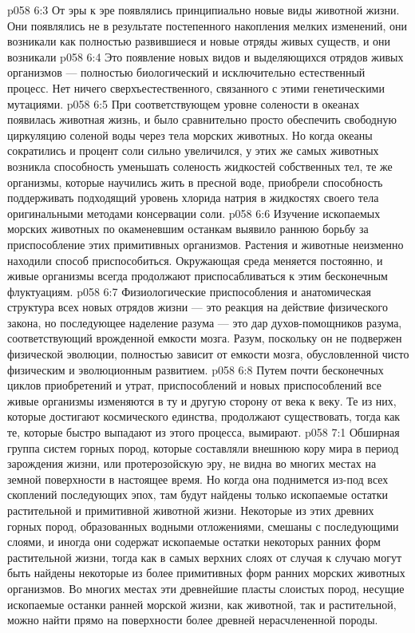 \vs p058 6:3 От эры к эре появлялись принципиально новые виды животной жизни. Они появлялись не в результате постепенного накопления мелких изменений, они возникали как полностью развившиеся и новые отряды живых существ, и они возникали 
\vs p058 6:4 Это  появление новых видов и выделяющихся отрядов живых организмов --- полностью биологический и исключительно естественный процесс. Нет ничего сверхъестественного, связанного с этими генетическими мутациями.
\vs p058 6:5 При соответствующем уровне солености в океанах появилась животная жизнь, и было сравнительно просто обеспечить свободную циркуляцию соленой воды через тела морских животных. Но когда океаны сократились и процент соли сильно увеличился, у этих же самых животных возникла способность уменьшать соленость жидкостей собственных тел, те же организмы, которые научились жить в пресной воде, приобрели способность поддерживать подходящий уровень хлорида натрия в жидкостях своего тела оригинальными методами консервации соли.
\vs p058 6:6 Изучение ископаемых морских животных по окаменевшим останкам выявило раннюю борьбу за приспособление этих примитивных организмов. Растения и животные неизменно находили способ приспособиться. Окружающая среда меняется постоянно, и живые организмы всегда продолжают приспосабливаться к этим бесконечным флуктуациям.
\vs p058 6:7 Физиологические приспособления и анатомическая структура всех новых отрядов жизни --- это реакция на действие физического закона, но последующее наделение разума --- это дар духов\hyp{}помощников разума, соответствующий врожденной емкости мозга. Разум, поскольку он не подвержен физической эволюции, полностью зависит от емкости мозга, обусловленной чисто физическим и эволюционным развитием.
\vs p058 6:8 Путем почти бесконечных циклов приобретений и утрат, приспособлений и новых приспособлений все живые организмы изменяются в ту и другую сторону от века к веку. Те из них, которые достигают космического единства, продолжают существовать, тогда как те, которые быстро выпадают из этого процесса, вымирают.
\vs p058 7:1 Обширная группа систем горных пород, которые составляли внешнюю кору мира в период зарождения жизни, или протерозойскую эру, не видна во многих местах на земной поверхности в настоящее время. Но когда она поднимется из\hyp{}под всех скоплений последующих эпох, там будут найдены только ископаемые остатки растительной и примитивной животной жизни. Некоторые из этих древних горных пород, образованных водными отложениями, смешаны с последующими слоями, и иногда они содержат ископаемые остатки некоторых ранних форм растительной жизни, тогда как в самых верхних слоях от случая к случаю могут быть найдены некоторые из более примитивных форм ранних морских животных организмов. Во многих местах эти древнейшие пласты слоистых пород, несущие ископаемые останки ранней морской жизни, как животной, так и растительной, можно найти прямо на поверхности более древней нерасчлененной породы.
